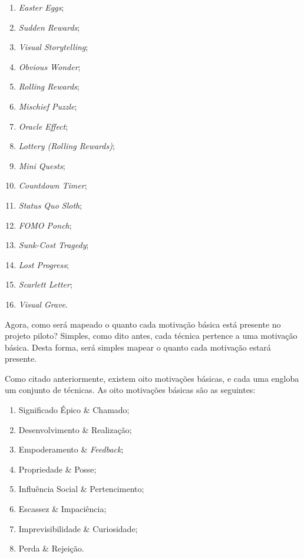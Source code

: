 \begin{multicols}{2}
\begin{enumerate}
        \item \textit{Easter Eggs};
        \item \textit{Sudden Rewards};
        \item \textit{Visual Storytelling};
        \item \textit{Obvious Wonder};
        \item \textit{Rolling Rewards};
        \item \textit{Mischief Puzzle};
        \item \textit{Oracle Effect};
        \item \textit{Lottery (Rolling Rewards)};
        \item \textit{Mini Quests};
        \item \textit{Countdown Timer};
        \item \textit{Status Quo Sloth};
        \item \textit{FOMO Ponch};
        \item \textit{Sunk-Cost Tragedy};
        \item \textit{Lost Progress};
        \item \textit{Scarlett Letter};
        \item \textit{Visual Grave}.
    \end{enumerate}
\end{multicols}

Agora, como será mapeado o quanto cada motivação básica está presente no projeto piloto? Simples, como dito antes,
cada técnica pertence a uma motivação básica. Desta forma, será simples mapear o quanto cada motivação estará presente.

Como citado anteriormente, existem oito motivações básicas, e cada uma engloba um conjunto de técnicas. As oito motivações básicas são as seguintes:

\begin{enumerate}
    \item Significado Épico \& Chamado;
    \item Desenvolvimento \& Realização;
    \item Empoderamento \& \textit{Feedback};
    \item Propriedade \& Posse;
    \item Influência Social \& Pertencimento;
    \item Escassez \& Impaciência;
    \item Imprevisibilidade \& Curiosidade;
    \item Perda \& Rejeição.
\end{enumerate}

